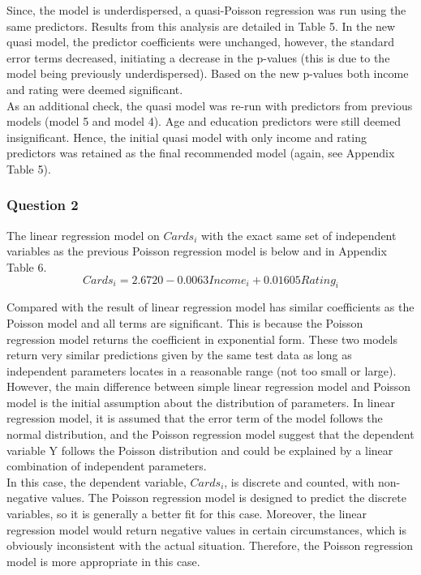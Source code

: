 \documentclass[12pt]{article}
\begin{document}
{Since, the model is underdispersed, a quasi-Poisson regression was run using the same predictors. Results from this analysis are detailed in Table 5. In the new quasi model, the predictor coefficients were unchanged, however, the standard error terms decreased, initiating a decrease in the p-values (this is due to the model being previously underdispersed). Based on the new p-values both income and rating were deemed  significant.\\

As an additional check, the quasi model was re-run with predictors from previous models (model 5 and model 4). Age and education predictors were still deemed insignificant. Hence, the initial quasi model with only income and rating predictors was retained as the final recommended model (again, see Appendix Table 5).

\subsubsection*{Question 2}
The linear regression model on $Cards_i$ with the exact same set of independent variables as the previous Poisson regression model is below and in Appendix Table 6.\\
$$Cards_i = 2.6720 - 0.0063Income_i + 0.01605Rating_i$$

Compared with the result of linear regression model has similar coefficients as the Poisson model and all terms are significant. This is because the Poisson regression model returns the coefficient in exponential form. These two models return very similar predictions given by the same test data as long as independent parameters locates in a reasonable range (not too small or large).\\

However, the main difference between simple linear regression model and Poisson model is the initial assumption about the distribution of parameters. In linear regression model, it is assumed that the error term of the model follows the normal distribution, and the Poisson regression model suggest that the dependent variable Y follows the Poisson distribution and could be explained by a linear combination of independent parameters.\\
  
In this case, the dependent variable, $Cards_i$, is discrete and counted, with non-negative values. The Poisson regression model is designed to predict the discrete variables, so it is generally a better fit for this case. Moreover, the linear regression model would return negative values in certain circumstances, which is obviously inconsistent with the actual situation. Therefore, the Poisson regression model is more appropriate in this case.


}
\end{document}

